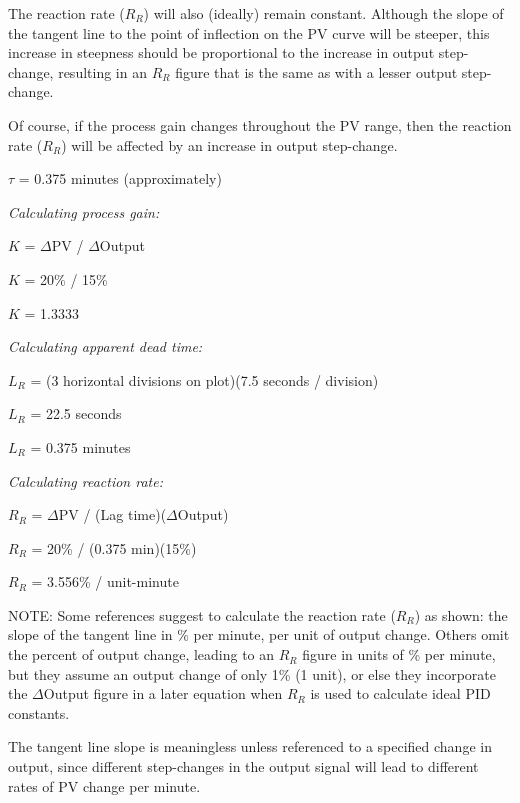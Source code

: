 The reaction rate ($R_R$) will also (ideally) remain constant.  Although the slope of the tangent line to the point of inflection on the PV curve will be steeper, this increase in steepness should be proportional to the increase in output step-change, resulting in an $R_R$ figure that is the same as with a lesser output step-change.

Of course, if the process gain changes throughout the PV range, then the reaction rate ($R_R$) will be affected by an increase in output step-change.

\vskip 10pt

$\tau$ = 0.375 minutes (approximately)







{\it Calculating process gain:}

$K$ = $\Delta$PV / $\Delta$Output

$K$ = 20\% / 15\%

$K$ = 1.3333
 
\vskip 10pt

{\it Calculating apparent dead time:}

$L_R$ = (3 horizontal divisions on plot)(7.5 seconds / division)

$L_R$ = 22.5 seconds

$L_R$ = 0.375 minutes
 
\vskip 10pt
 
{\it Calculating reaction rate:}

$R_R$ = $\Delta$PV / (Lag time)($\Delta$Output)

$R_R$ = 20\% / (0.375 min)(15\%)

$R_R$ = 3.556\% / unit-minute
 
\vskip 10pt
 
NOTE: Some references suggest to calculate the reaction rate ($R_R$) as shown: the slope of the tangent line in \% per minute, per unit of output change.  Others omit the percent of output change, leading to an $R_R$ figure in units of \% per minute, but they assume an output change of only 1\% (1 unit), or else they incorporate the $\Delta$Output figure in a later equation when $R_R$ is used to calculate ideal PID constants.  

The tangent line slope is meaningless unless referenced to a specified change in output, since different step-changes in the output signal will lead to different rates of PV change per minute.

